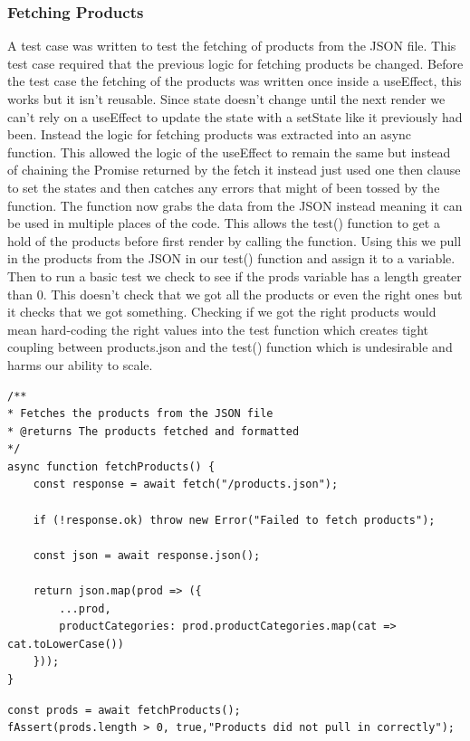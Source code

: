 \documentclass{article}[12pt]
\begin{document}
\subsubsection{Fetching Products}
A test case was written to test the fetching of products from the JSON file. This test case required that the previous logic for fetching products be changed. Before the test case the fetching of the products was written once inside a useEffect, this works but it isn't reusable. Since state doesn't change until the next render we can't rely on a useEffect to update the state with a setState like it previously had been. Instead the logic for fetching products was extracted into an async function. This allowed the logic of the useEffect to remain the same but instead of chaining the Promise returned by the fetch it instead just used one then clause to set the states and then catches any errors that might of been tossed by the function. The function now grabs the data from the JSON instead meaning it can be used in multiple places of the code. This allows the test() function to get a hold of the products before first render by calling the function. Using this we pull in the products from the JSON in our test() function and assign it to a variable. Then to run a basic test we check to see if the prods variable has a length greater than 0. This doesn't check that we got all the products or even the right ones but it checks that we got something. Checking if we got the right products would mean hard-coding the right values into the test function which creates tight coupling between products.json and the test() function which is undesirable and harms our ability to scale.

\begin{lstlisting}[caption=fetchProducts() function]
/**
* Fetches the products from the JSON file
* @returns The products fetched and formatted
*/
async function fetchProducts() {
    const response = await fetch("/products.json");

    if (!response.ok) throw new Error("Failed to fetch products");

    const json = await response.json();

    return json.map(prod => ({
        ...prod,
        productCategories: prod.productCategories.map(cat => cat.toLowerCase())
    }));
}
\end{lstlisting}

\begin{lstlisting}[caption=Test Case]
const prods = await fetchProducts();
fAssert(prods.length > 0, true,"Products did not pull in correctly");
\end{lstlisting}
\end{document}

